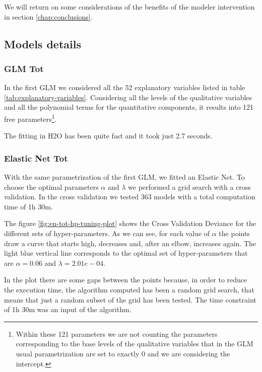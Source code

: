 \documentclass[a4paper, twoside, openright, 12pt]{report}
\theoremstyle{definition}
\theoremstyle{definition}
\theoremstyle{definition}
\theoremstyle{remark}
\begin{document}
We will return on some considerations of the benefits of the modeler intervention in section \ref{chap:conclusions}.

\newpage

\hypertarget{chap:models-details}{%
\subsection{Models details}\label{chap:models-details}}

\hypertarget{glm-tot}{%
\subsubsection{GLM Tot}\label{glm-tot}}

In the first GLM we considered all the 52 explanatory variables listed in table \ref{tab:explanatory-variables}. Considering all the levels of the qualitative variables and all the polynomial terms for the quantitative components, it results into 121 free parameters\footnote{Within these 121 parameters we are not counting the parameters corresponding to the base levels of the qualitative variables that in the GLM usual parametrization are set to exactly 0 and we are considering the intercept.}.

The fitting in H2O has been quite fast and it took just 2.7 seconds.

\hypertarget{elastic-net-tot}{%
\subsubsection{Elastic Net Tot}\label{elastic-net-tot}}

With the same parametrization of the first GLM, we fitted an Elastic Net. To choose the optimal parameters \(\alpha\) and \(\lambda\) we performed a grid search with a cross validation. In the cross validation we tested 363 models with a total computation time of 1h 30m.

The figure \ref{fig:en-tot-hp-tuning-plot} shows the Cross Validation Deviance for the different sets of hyper-parameters. As we can see, for each value of \(\alpha\) the points draw a curve that starts high, decreases and, after an elbow, increases again. The light blue vertical line corresponds to the optimal set of hyper-parameters that are \(\alpha = 0.06\) and \(\lambda = 2.01e-04\).

In the plot there are some gaps between the points because, in order to reduce the execution time, the algorithm computed has been a random grid search, that means that just a random subset of the grid has been tested. The time constraint of 1h 30m was an input of the algorithm.
\end{document}
